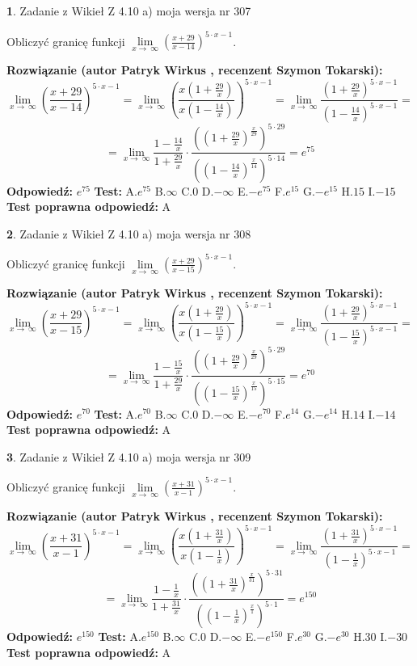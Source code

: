 \documentclass[12pt, a4paper]{article}
\theoremstyle{definition} %
\newtheorem{zad}{}
\newcommand{\zadStart}[1]{\begin{zad}#1\newline}
\newcommand{\zadStop}{\end{zad}}
\newcommand{\rozwStart}[2]{\noindent \textbf{Rozwiązanie (autor #1 , recenzent #2): }\newline}
\newcommand{\rozwStop}{\newline}
\newcommand{\odpStart}{\noindent \textbf{Odpowiedź:}\newline}
\newcommand{\odpStop}{\newline}
\newcommand{\testStart}{\noindent \textbf{Test:}\newline}
\newcommand{\testStop}{\newline}
\newcommand{\kluczStart}{\noindent \textbf{Test poprawna odpowiedź:}\newline}
\newcommand{\kluczStop}{\newline}
\begin{document}
\zadStart{Zadanie z Wikieł Z 4.10 a) moja wersja nr 307}

Obliczyć granicę funkcji  $\lim\limits_{x\to\ \infty}(\frac{x+29}{x-14})^{5\cdot x-1}$.
\zadStop
\rozwStart{Patryk Wirkus}{Szymon Tokarski}
$$\lim\limits_{x\to\ \infty}(\frac{x+29}{x-14})^{5\cdot x-1} = \lim\limits_{x\to\ \infty}(\frac{x(1+\frac{29}{x})}{x(1-\frac{14}{x})})^{5\cdot x-1}=\lim\limits_{x\to\ \infty}\frac{(1+\frac{29}{x})^{5\cdot x-1}}{(1-\frac{14}{x})^{5\cdot x-1}}=$$
$$=\lim\limits_{x\to\ \infty}\frac{1-\frac{14}{x}}{1+\frac{29}{x}}\cdot\frac{((1+\frac{29}{x})^{\frac{x}{29}})^{5\cdot29}}{((1-\frac{14}{x})^{\frac{x}{14}})^{5\cdot14}}=e^{75}$$
\rozwStop
\odpStart
$e^{75}$
\odpStop
\testStart
A.$e^{75}$ B.$\infty$ C.$0$ D.$-\infty$ E.$-e^{75}$
F.$e^{15}$ G.$-e^{15}$
H.$15$
I.$-15$
\testStop
\kluczStart
A
\kluczStop



\zadStart{Zadanie z Wikieł Z 4.10 a) moja wersja nr 308}

Obliczyć granicę funkcji  $\lim\limits_{x\to\ \infty}(\frac{x+29}{x-15})^{5\cdot x-1}$.
\zadStop
\rozwStart{Patryk Wirkus}{Szymon Tokarski}
$$\lim\limits_{x\to\ \infty}(\frac{x+29}{x-15})^{5\cdot x-1} = \lim\limits_{x\to\ \infty}(\frac{x(1+\frac{29}{x})}{x(1-\frac{15}{x})})^{5\cdot x-1}=\lim\limits_{x\to\ \infty}\frac{(1+\frac{29}{x})^{5\cdot x-1}}{(1-\frac{15}{x})^{5\cdot x-1}}=$$
$$=\lim\limits_{x\to\ \infty}\frac{1-\frac{15}{x}}{1+\frac{29}{x}}\cdot\frac{((1+\frac{29}{x})^{\frac{x}{29}})^{5\cdot29}}{((1-\frac{15}{x})^{\frac{x}{15}})^{5\cdot15}}=e^{70}$$
\rozwStop
\odpStart
$e^{70}$
\odpStop
\testStart
A.$e^{70}$ B.$\infty$ C.$0$ D.$-\infty$ E.$-e^{70}$
F.$e^{14}$ G.$-e^{14}$
H.$14$
I.$-14$
\testStop
\kluczStart
A
\kluczStop



\zadStart{Zadanie z Wikieł Z 4.10 a) moja wersja nr 309}

Obliczyć granicę funkcji  $\lim\limits_{x\to\ \infty}(\frac{x+31}{x-1})^{5\cdot x-1}$.
\zadStop
\rozwStart{Patryk Wirkus}{Szymon Tokarski}
$$\lim\limits_{x\to\ \infty}(\frac{x+31}{x-1})^{5\cdot x-1} = \lim\limits_{x\to\ \infty}(\frac{x(1+\frac{31}{x})}{x(1-\frac{1}{x})})^{5\cdot x-1}=\lim\limits_{x\to\ \infty}\frac{(1+\frac{31}{x})^{5\cdot x-1}}{(1-\frac{1}{x})^{5\cdot x-1}}=$$
$$=\lim\limits_{x\to\ \infty}\frac{1-\frac{1}{x}}{1+\frac{31}{x}}\cdot\frac{((1+\frac{31}{x})^{\frac{x}{31}})^{5\cdot31}}{((1-\frac{1}{x})^{\frac{x}{1}})^{5\cdot1}}=e^{150}$$
\rozwStop
\odpStart
$e^{150}$
\odpStop
\testStart
A.$e^{150}$ B.$\infty$ C.$0$ D.$-\infty$ E.$-e^{150}$
F.$e^{30}$ G.$-e^{30}$
H.$30$
I.$-30$
\testStop
\kluczStart
A
\kluczStop
\end{document}
